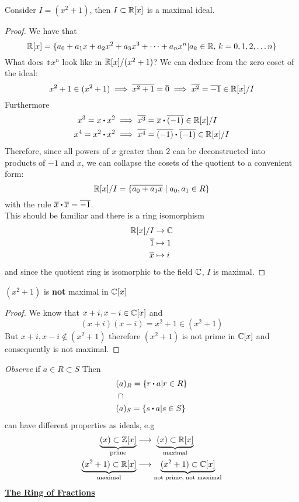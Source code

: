 \documentclass[../Main.tex]{subfiles}
\begin{document}
\begin{claim}
Consider $I=(x^2+1)$, then $I\subset \mathbb{R}[x]$ is a maximal ideal.
\end{claim}
\begin{proof}
	We have that
	\[\mathbb{R}[x] = \{a_0+a_1x+a_2x^2+a_3x^3+\dots+a_nx^n| a_k\in \mathbb{R}, \, k=0,1,2,\dots n\}\]
	What does $\obar{x^n}$ look like in $\mathbb{R}[x]/(x^2+1)$?
	We can deduce from the zero coset of the ideal:
		\[x^2+1 \in (x^2+1) \implies \overline{x^2+1} = \overline{0} \implies \overline{x^2} = \overline{-1} \in \mathbb{R}[x]/I \]
	Furthermore
		\begin{align*}
		x^3 = x\rdot x^2 &\implies \obar{x^3} = \obar{x} \rdot \obar{(-1)} \in \R[x]/I\\
		x^4= x^2\rdot x^2 &\implies \obar{x^4} = \obar{(-1)} \rdot  \obar{(-1)} \in \R[x]/I
	\end{align*}
	Therefore, since all powers of $x$ greater than $2$ can be deconstructed into products of $-1$ and $x$, we can collapse the cosets of the quotient to a convenient form:
	\[\mathbb{R}[x]/I = \{\overline{a_0+a_1x}\mid a_0,a_1\in R\} \]
	with the rule $\obar{x}\rdot \obar{x}=\obar{-1}$.\\
	This should be familiar and there is a ring isomorphism
	\begin{align*}
	\mathbb{R}[x]/I &\to \mathbb{C} \\
	\overline{1} &\mapsto 1 \\
	\overline{x} &\mapsto i
	\end{align*}
	and since the quotient ring is isomorphic to the field $\mathbb{C}$, $I$ is maximal.
\end{proof}
\begin{claim}
	$(x^2+1)$ is \textbf{not} maximal in $\mathbb{C}[x]$
\end{claim}
\begin{proof}
	We know that $x+i,x-i \in \mathbb{C}[x]$ and
	\[(x+i)(x-i)=x^2+1\in (x^2+1)\]
	But $x+i,x-i \notin (x^2+1)$ therefore $(x^2+1)$ is not prime in $\mathbb{C}[x]$ and consequently is not maximal.
\end{proof}
\textit{Observe} if $a\in R\subset S$ Then
\begin{align*}
(a&)_R = \{r\rdot a | r\in R\}\\
\cap&\\
(a&)_S=\{s\rdot a|s\in S\}
\end{align*}
can have different properties as ideals, e.g
\begin{align*}
\underbrace{(x)\subset \mathbb{Z}[x]}_{\text{prime}} &\longrightarrow \,\,\underbrace{(x) \subset \mathbb{R}[x]}_{\text{maximal}}
\\
\underbrace{(x^2+1)\subset \mathbb{R}[x]}_{\text{maximal}} &\longrightarrow \underbrace{(x^2+1) \subset \mathbb{C}[x]}_{\text{not prime, not maximal}}
\end{align*}\newpage
\underline{\textbf{\Large The Ring of Fractions}}
\end{document}
